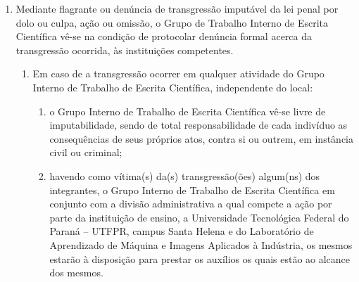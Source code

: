 \begin{enumerate}[resume, label=Art. \arabic*]
\item Mediante flagrante ou denúncia de transgressão imputável da lei penal por dolo ou culpa, ação ou omissão, o Grupo de Trabalho Interno de Escrita Científica vê-se na condição de protocolar denúncia formal acerca da transgressão ocorrida, às instituições competentes.

\begin{enumerate}[label= \S \arabic*] %

\item Em caso de a transgressão ocorrer em qualquer atividade do Grupo Interno de Trabalho de Escrita Científica, independente do local:

    \begin{enumerate}[label= \roman*.]
        \item o Grupo Interno de Trabalho de Escrita Científica vê-se livre  de imputabilidade, sendo de total responsabilidade de cada indivíduo as consequências de seus próprios atos, contra si ou outrem, em instância civil ou criminal;
        
        \item havendo como vítima(s) da(s) transgressão(ões) algum(ns) dos integrantes, o  Grupo Interno de Trabalho de Escrita Científica em conjunto com a divisão administrativa a qual compete a ação por parte da instituição de ensino, a Universidade Tecnológica Federal do Paraná – UTFPR, campus Santa Helena e do Laboratório de Aprendizado de Máquina e Imagens Aplicados à Indústria, os mesmos estarão à disposição para prestar os auxílios os quais estão ao alcance dos mesmos.
    \end{enumerate}


\end{enumerate}


\end{enumerate}








